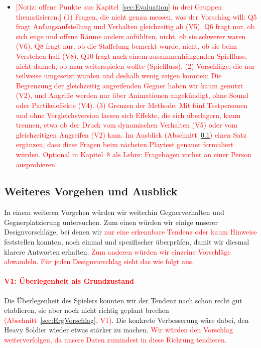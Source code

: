 \documentclass[../Main.tex]{subfiles}
\begin{document}
\begin{itemize}[leftmargin=1.5cm]
    \item \textcolor{red}{[Notiz: offene Punkte aus Kapitel~\ref{sec:Evaluation} in drei Gruppen thematisieren.] (1) Fragen, die nicht genau messen, was der Vorschlag will: Q5 fragt Anfangsaufstellung und Verhalten gleichzeitig ab (V5). Q6 fragt nur, ob sich enge und offene Räume anders anfühlten, nicht, ob sie schwerer waren (V6). Q8 fragt nur, ob die Staffelung bemerkt wurde, nicht, ob sie beim Verstehen half (V8). Q10 fragt nach einem zusammenhängenden Spielfluss, nicht danach, ob man weiterspielen wollte (Spielfluss). (2) Vorschläge, die nur teilweise umgesetzt wurden und deshalb wenig zeigen konnten: Die Begrenzung der gleichzeitig angreifenden Gegner haben wir kaum genutzt (V2), und Angriffe werden nur über Animationen angekündigt, ohne Sound oder Partikeleffekte (V4). (3) Grenzen der Methode: Mit fünf Testpersonen und ohne Vergleichsversion lassen sich Effekte, die sich überlagern, kaum trennen, etwa ob der Druck vom dynamischen Verhalten (V5) oder vom gleichzeitigen Angreifen (V2) kam. Im Ausblick (Abschnitt~\ref{sec:Verbesserungen}) einen Satz ergänzen, dass diese Fragen beim nächsten Playtest genauer formuliert würden. Optional in Kapitel~8 als Lehre: Fragebögen vorher an einer Person ausprobieren.}
\end{itemize}

\subsection{Weiteres Vorgehen und Ausblick} \label{sec:Verbesserungen}

In einem weiteren Vorgehen würden wir weiterhin Gegnerverhalten und Gegnerplatzierung untersuchen. Zum einen würden wir einige unserer Designvorschläge, bei denen wir \textcolor{red}{nur eine erkennbare Tendenz oder kaum Hinweise} feststellen konnten, noch einmal und spezifischer überprüfen, damit wir diesmal klarere Antworten erhalten. \textcolor{red}{Zum anderen würden wir einzelne Vorschläge abwandeln. Für jeden Designvorschlag sieht das wie folgt aus.}

\paragraph{\textcolor{red}{V1: Überlegenheit als Grundzustand}}
Die Überlegenheit des Spielers konnten wir der Tendenz nach schon recht gut etablieren, sie aber noch nicht richtig geplant brechen \textcolor{red}{(Abschnitt~\ref{sec:ErgVorschlag}, V1)}. Die konkrete Verbesserung wäre dabei, den Heavy Soldier wieder etwas stärker zu machen. \textcolor{red}{Wir würden den Vorschlag weiterverfolgen, da unsere Daten zumindest in diese Richtung tendieren.}
\end{document}
